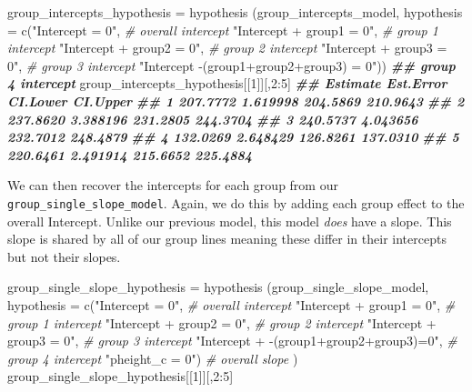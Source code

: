 \documentclass[
]{book}
\newenvironment{Shaded}{\begin{snugshade}}{\end{snugshade}}
\newcommand{\AttributeTok}[1]{\textcolor[rgb]{0.77,0.63,0.00}{#1}}
\newcommand{\CommentTok}[1]{\textcolor[rgb]{0.56,0.35,0.01}{\textit{#1}}}
\newcommand{\DecValTok}[1]{\textcolor[rgb]{0.00,0.00,0.81}{#1}}
\newcommand{\DocumentationTok}[1]{\textcolor[rgb]{0.56,0.35,0.01}{\textbf{\textit{#1}}}}
\newcommand{\FunctionTok}[1]{\textcolor[rgb]{0.00,0.00,0.00}{#1}}
\newcommand{\NormalTok}[1]{#1}
\newcommand{\OtherTok}[1]{\textcolor[rgb]{0.56,0.35,0.01}{#1}}
\newcommand{\SpecialCharTok}[1]{\textcolor[rgb]{0.00,0.00,0.00}{#1}}
\newcommand{\StringTok}[1]{\textcolor[rgb]{0.31,0.60,0.02}{#1}}
\begin{document}
\begin{Shaded}
\begin{Highlighting}[]
\NormalTok{group\_intercepts\_hypothesis }\OtherTok{=} 
  \FunctionTok{hypothesis}\NormalTok{ (group\_intercepts\_model,}
              \AttributeTok{hypothesis =} 
                \FunctionTok{c}\NormalTok{(}\StringTok{"Intercept = 0"}\NormalTok{,  }\CommentTok{\# overall intercept}
                \StringTok{"Intercept + group1 = 0"}\NormalTok{,  }\CommentTok{\# group 1 intercept}
                \StringTok{"Intercept + group2 = 0"}\NormalTok{,  }\CommentTok{\# group 2 intercept}
                \StringTok{"Intercept + group3 = 0"}\NormalTok{,  }\CommentTok{\# group 3 intercept}
                \StringTok{"Intercept {-}(group1+group2+group3) = 0"}\NormalTok{)) }\DocumentationTok{\#\# group 4 intercept}
\NormalTok{group\_intercepts\_hypothesis[[}\DecValTok{1}\NormalTok{]][,}\DecValTok{2}\SpecialCharTok{:}\DecValTok{5}\NormalTok{]}
\DocumentationTok{\#\#   Estimate Est.Error CI.Lower CI.Upper}
\DocumentationTok{\#\# 1 207.7772  1.619998 204.5869 210.9643}
\DocumentationTok{\#\# 2 237.8620  3.388196 231.2805 244.3704}
\DocumentationTok{\#\# 3 240.5737  4.043656 232.7012 248.4879}
\DocumentationTok{\#\# 4 132.0269  2.648429 126.8261 137.0310}
\DocumentationTok{\#\# 5 220.6461  2.491914 215.6652 225.4884}
\end{Highlighting}
\end{Shaded}

We can then recover the intercepts for each group from our \texttt{group\_single\_slope\_model}. Again, we do this by adding each group effect to the overall Intercept. Unlike our previous model, this model \emph{does} have a slope. This slope is shared by all of our group lines meaning these differ in their intercepts but not their slopes.

\begin{Shaded}
\begin{Highlighting}[]
\NormalTok{group\_single\_slope\_hypothesis }\OtherTok{=} 
  \FunctionTok{hypothesis}\NormalTok{ (group\_single\_slope\_model,}
              \AttributeTok{hypothesis =} 
                \FunctionTok{c}\NormalTok{(}\StringTok{"Intercept = 0"}\NormalTok{, }\CommentTok{\# overall intercept}
                  \StringTok{"Intercept + group1 = 0"}\NormalTok{,  }\CommentTok{\# group 1 intercept}
                  \StringTok{"Intercept + group2 = 0"}\NormalTok{,  }\CommentTok{\# group 2 intercept}
                  \StringTok{"Intercept + group3 = 0"}\NormalTok{,  }\CommentTok{\# group 3 intercept}
                  \StringTok{"Intercept + {-}(group1+group2+group3)=0"}\NormalTok{, }\CommentTok{\# group 4 intercept}
                  \StringTok{"pheight\_c = 0"}\NormalTok{) }\CommentTok{\# overall slope}
\NormalTok{)   }
\NormalTok{group\_single\_slope\_hypothesis[[}\DecValTok{1}\NormalTok{]][,}\DecValTok{2}\SpecialCharTok{:}\DecValTok{5}\NormalTok{]}
\end{Highlighting}
\end{Shaded}
\end{document}

